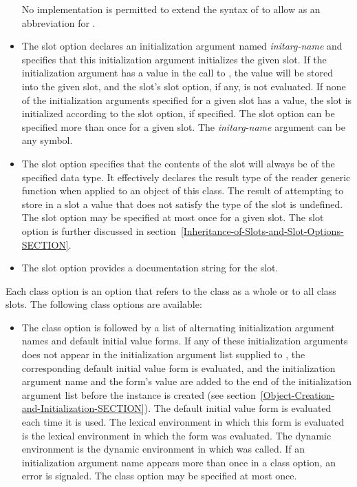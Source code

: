 \begin{defmac}
\begin{itemize}
No implementation is permitted to extend the syntax of 
to allow  as an abbreviation for 
.

\item 
The  slot option declares an initialization argument
named \emph{initarg-name} and specifies that this initialization argument
initializes the given slot.  If the initialization argument has a
value in the call to , the value will be
stored into the given slot, and the slot's  slot option, if
any, is not evaluated.  If none of the initialization arguments
specified for a given slot has a value, the slot is initialized
according to the  slot option, if specified.  The 
 slot option can be specified more than once for a given
slot.  The \emph{initarg-name} argument can be any symbol.

\item 
The  slot option specifies that the contents of the slot
will always be of the specified data type.  It effectively declares
the result type of the reader generic function when applied to an
object of this class.  The result of attempting to store in a slot a
value that does not satisfy the type of the slot is undefined.  The
 slot option may be specified at most once for a given
slot.  The  slot option is further discussed in
section~\ref{Inheritance-of-Slots-and-Slot-Options-SECTION}.

\item 
The  slot option provides a documentation string
for the slot.
\end{itemize}

Each class option is an option that refers to the class as a whole
or to all class slots.  The following class options are available:

\begin{itemize}
\item 
The  class option is followed by a list of
alternating initialization argument names and default initial value
forms.  If any of these initialization arguments does not appear in
the initialization argument list supplied to , the
corresponding default initial value form is evaluated, and the
initialization argument name and the form's value are added to the end
of the initialization argument list before the instance is created
(see section~\ref{Object-Creation-and-Initialization-SECTION}).  The default
initial value form is evaluated each time it is used.  The lexical
environment in which this form is evaluated is the lexical environment
in which the  form was evaluated.  The dynamic
environment is the dynamic environment in which 
was called.  If an initialization argument name appears more than once
in a  class option, an error is signaled.  The
 class option may be specified at most once.


\end{itemize}
\end{defmac}

